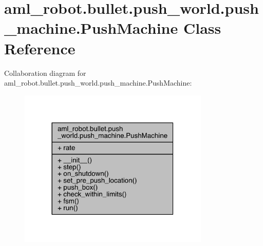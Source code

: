\hypertarget{classaml__robot_1_1bullet_1_1push__world_1_1push__machine_1_1_push_machine}{}\section{aml\+\_\+robot.\+bullet.\+push\+\_\+world.\+push\+\_\+machine.\+Push\+Machine Class Reference}
\label{classaml__robot_1_1bullet_1_1push__world_1_1push__machine_1_1_push_machine}


Collaboration diagram for aml\+\_\+robot.\+bullet.\+push\+\_\+world.\+push\+\_\+machine.\+Push\+Machine\+:
\nopagebreak
\begin{figure}[H]
\begin{center}
\leavevmode
\includegraphics[width=257pt]{classaml__robot_1_1bullet_1_1push__world_1_1push__machine_1_1_push_machine__coll__graph}
\end{center}
\end{figure}
